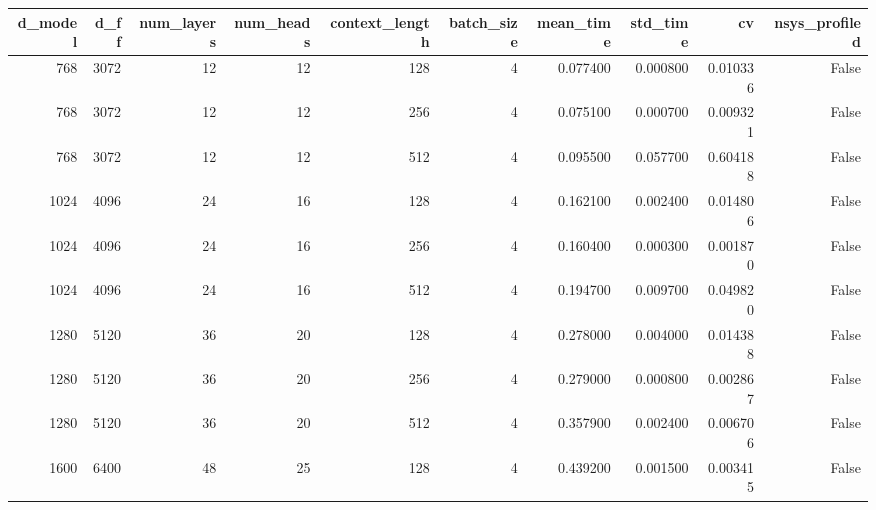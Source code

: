 \begin{tabular}{rrrrrrrrrr}
\toprule
d_model & d_ff & num_layers & num_heads & context_length & batch_size & mean_time & std_time & cv & nsys_profiled \\
\midrule
768 & 3072 & 12 & 12 & 128 & 4 & 0.077400 & 0.000800 & 0.010336 & False \\
768 & 3072 & 12 & 12 & 256 & 4 & 0.075100 & 0.000700 & 0.009321 & False \\
768 & 3072 & 12 & 12 & 512 & 4 & 0.095500 & 0.057700 & 0.604188 & False \\
1024 & 4096 & 24 & 16 & 128 & 4 & 0.162100 & 0.002400 & 0.014806 & False \\
1024 & 4096 & 24 & 16 & 256 & 4 & 0.160400 & 0.000300 & 0.001870 & False \\
1024 & 4096 & 24 & 16 & 512 & 4 & 0.194700 & 0.009700 & 0.049820 & False \\
1280 & 5120 & 36 & 20 & 128 & 4 & 0.278000 & 0.004000 & 0.014388 & False \\
1280 & 5120 & 36 & 20 & 256 & 4 & 0.279000 & 0.000800 & 0.002867 & False \\
1280 & 5120 & 36 & 20 & 512 & 4 & 0.357900 & 0.002400 & 0.006706 & False \\
1600 & 6400 & 48 & 25 & 128 & 4 & 0.439200 & 0.001500 & 0.003415 & False \\
\bottomrule
\end{tabular}
